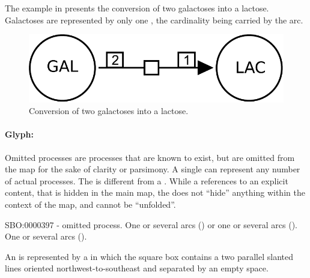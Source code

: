 The example in  presents the conversion of two galactoses into a lactose.  Galactoses are represented by only one , the cardinality being carried by the  arc.

\begin{figure}[H]
  \centering
  \includegraphics[scale = 0.3]{examples/process-dimerisation}
  \caption{Conversion of two galactoses into a lactose.}
  \label{fig:trans-dim}
\end{figure}



\paragraph{Glyph: }\label{sec:omitted}

Omitted processes are processes that are known to exist, but are omitted from the map for the sake of clarity or parsimony. A single  can represent any number of actual processes. The  is different from a . While a  references to an explicit content, that is hidden in the main map, the  does not ``hide'' anything within the context of the map, and cannot be ``unfolded''.

\begin{glyphDescription}
 \glyphSboTerm SBO:0000397 - omitted process.
 \glyphOrigin One or several  arcs () or one or several  arcs ().
 \glyphTarget One or several  arcs ().

 \glyphNode An  is represented by a  in which the square box contains a two parallel slanted lines oriented northwest-to-southeast and separated by an empty space.
 \end{glyphDescription}

